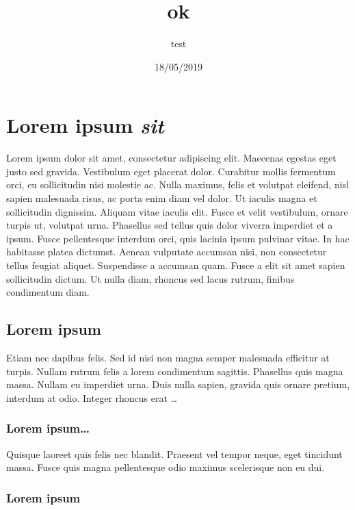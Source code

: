 \author{test}
\title{ok}
\date{18/05/2019}


\maketitle

\section{Lorem ipsum \textit{sit}}

Lorem ipsum dolor sit amet, consectetur adipiscing elit. Maecenas egestas eget justo sed gravida. Vestibulum eget placerat dolor. Curabitur mollis fermentum orci, eu sollicitudin nisi molestie ac. Nulla maximus, felis et volutpat eleifend, nisl sapien malesuada risus, ac porta enim diam vel dolor. Ut iaculis magna et sollicitudin dignissim. Aliquam vitae iaculis elit. Fusce et velit vestibulum, ornare turpis ut, volutpat urna. Phasellus sed tellus quis dolor viverra imperdiet et a ipsum. Fusce pellentesque interdum orci, quis lacinia ipsum pulvinar vitae. In hac habitasse platea dictumst. Aenean vulputate accumsan nisi, non consectetur tellus feugiat aliquet. Suspendisse a accumsan quam. Fusce a elit sit amet sapien sollicitudin dictum. Ut nulla diam, rhoncus sed lacus rutrum, finibus condimentum diam. 

\subsection{Lorem ipsum}

Etiam nec dapibus felis. Sed id nisi non magna semper malesuada efficitur at turpis. Nullam rutrum felis a lorem condimentum sagittis. Phasellus quis magna massa. Nullam eu imperdiet urna. Duis nulla sapien, gravida quis ornare pretium, interdum at odio. Integer rhoncus erat 
\ldots

\subsubsection{Lorem ipsum\ldots}

Quisque laoreet quis felis nec blandit. Praesent vel tempor neque, eget tincidunt massa. Fusce quis magna pellentesque odio maximus scelerisque non eu dui.

\subsubsection{Lorem ipsum}

